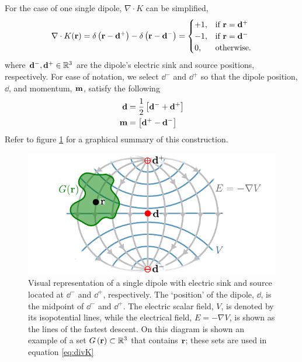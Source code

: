 For the case of one single dipole, $\nabla \cdot K$ can be simplified,
\begin{equation}
\nabla \cdot K(\mathbf{r}) = {\delta\left( \mathbf{r}-\mathbf{d}^+ \right) - \delta\left( \mathbf{r}-\mathbf{d}^- \right)} =
\begin{cases}
+1, &\text{if } \mathbf{r}=\mathbf{d}^+ \\
-1, &\text{if } \mathbf{r}=\mathbf{d}^- \\
0, &\text{otherwise}.
\end{cases}
\label{eq:model2}
\end{equation}
where $\mathbf{d}^-, \mathbf{d}^+ \in \mathbb{R}^3$ are the dipole's electric sink and source positions, respectively. 
%
For ease of notation, we select $\dd^-$ and $\dd^+$ so that the dipole position, $\dd$, and momentum, $\mathbf{m}$, satisfy the following
\begin{align}
    \mathbf{d} &= \frac{1}{2}\left[ \mathbf{d}^-+\mathbf{d}^+ \right] 
    \\
    \mathbf{m} &= \left[ \mathbf{d}^+-\mathbf{d}^- \right]
\end{align}
%
Refer to figure \ref{fig:diagrams1} for a graphical summary of this construction.

\begin{figure}
\centering
\includegraphics{./img/CurrDensField.pdf}
\caption{Visual representation of a single dipole with electric sink and source located at $\dd^-$ and $\dd^+$, respectively.
%
The `position' of the dipole, $\dd$, is the midpoint of $\dd^-$ and $\dd^+$.
%
The electric scalar field, $V$, is denoted by its isopotential lines, while the electrical field, $E= -\nabla V$, is shown as the lines of the fastest descent.
%
On this diagram is shown an example of a set $G\left( \mathbf{r} \right) \subset \mathbb{R}^3$ that contains $\mathbf{r}$; these sets are used in equation \eqref{eq:divK}
%
}
\label{fig:diagrams1}
\end{figure}

